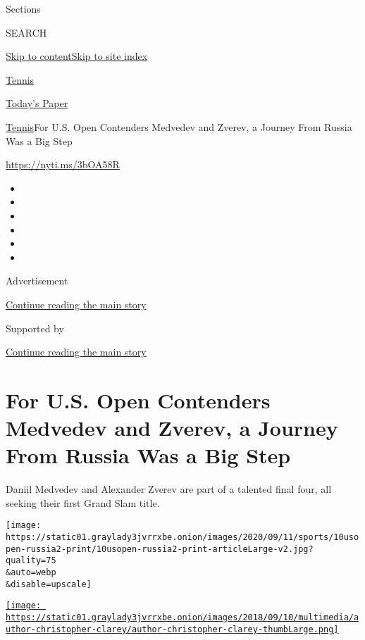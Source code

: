 Sections

SEARCH

\protect\hyperlink{site-content}{Skip to
content}\protect\hyperlink{site-index}{Skip to site index}

\href{https://www.nytimes3xbfgragh.onion/section/sports/tennis}{Tennis}

\href{https://myaccount.nytimes3xbfgragh.onion/auth/login?response_type=cookie\&client_id=vi}{}

\href{https://www.nytimes3xbfgragh.onion/section/todayspaper}{Today's
Paper}

\href{/section/sports/tennis}{Tennis}\textbar{}For U.S. Open Contenders
Medvedev and Zverev, a Journey From Russia Was a Big Step

\url{https://nyti.ms/3bOA58R}

\begin{itemize}
\item
\item
\item
\item
\item
\item
\end{itemize}

Advertisement

\protect\hyperlink{after-top}{Continue reading the main story}

Supported by

\protect\hyperlink{after-sponsor}{Continue reading the main story}

\hypertarget{for-us-open-contenders-medvedev-and-zverev-a-journey-from-russia-was-a-big-step}{%
\section{For U.S. Open Contenders Medvedev and Zverev, a Journey From
Russia Was a Big
Step}\label{for-us-open-contenders-medvedev-and-zverev-a-journey-from-russia-was-a-big-step}}

Daniil Medvedev and Alexander Zverev are part of a talented final four,
all seeking their first Grand Slam title.

\texttt{[image: https://static01.graylady3jvrrxbe.onion/images/2020/09/11/sports/10usopen-russia2-print/10usopen-russia2-print-articleLarge-v2.jpg?quality=75\\\&auto=webp\\\&disable=upscale]}

\href{https://www.nytimes3xbfgragh.onion/by/christopher-clarey}{\texttt{[image: https://static01.graylady3jvrrxbe.onion/images/2018/09/10/multimedia/author-christopher-clarey/author-christopher-clarey-thumbLarge.png]}}

